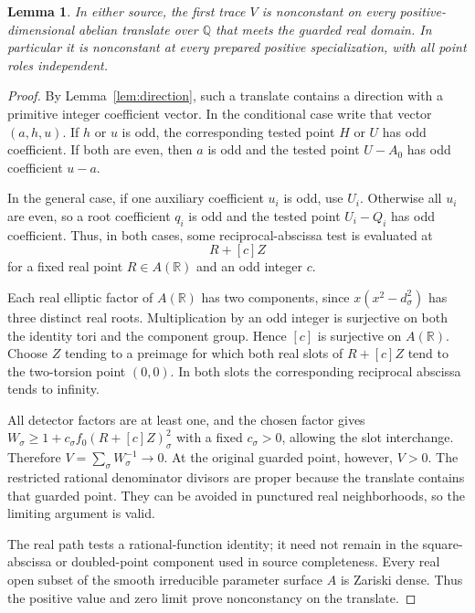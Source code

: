 \documentclass[11pt,a4paper]{article}
\newtheorem{lemma}[theorem]{Lemma}
\newcommand{\Q}{\mathbb Q}\newcommand{\Z}{\mathbb Z}
\begin{document}
\begin{lemma}\label{lem:nonconstant}
In either source, the first trace $V$ is nonconstant on every
positive-dimensional abelian translate over $\Q$ that meets the
guarded real domain. In particular it is nonconstant at every
prepared positive specialization, with all point roles independent.
\end{lemma}
\begin{proof}
By Lemma~\ref{lem:direction}, such a translate contains a direction
with a primitive integer coefficient vector. In the conditional
case write that vector $(a,h,u)$. If $h$ or $u$ is odd, the
corresponding tested point $H$ or $U$ has odd coefficient. If
both are even, then $a$ is odd and the tested point $U-A_0$ has
odd coefficient $u-a$.

In the general case, if one auxiliary coefficient $u_i$ is odd,
use $U_i$. Otherwise all $u_i$ are even, so a root coefficient
$q_i$ is odd and the tested point $U_i-Q_i$ has odd coefficient.
Thus, in both cases, some reciprocal-abscissa test is evaluated at
\[
                             R+[c]Z
\]
for a fixed real point $R\in A(\mathbb R)$ and an odd integer $c$.

Each real elliptic factor of $A(\mathbb R)$ has two components,
since $x(x^2-d_\sigma^2)$ has three distinct real roots.
Multiplication by an odd integer is surjective on both the identity
tori and the component group. Hence $[c]$ is surjective on
$A(\mathbb R)$. Choose $Z$ tending to a preimage for which both
real slots of $R+[c]Z$ tend to the two-torsion point $(0,0)$.
In both slots the corresponding reciprocal abscissa tends to infinity.

All detector factors are at least one, and the chosen factor gives
$W_\sigma\ge1+c_\sigma f_0(R+[c]Z)_\sigma^2$ with a fixed
$c_\sigma>0$, allowing the slot interchange. Therefore
$V=\sum_\sigma W_\sigma^{-1}\longrightarrow0$.
At the original guarded point, however, $V>0$.
The restricted rational denominator divisors are proper because the
translate contains that guarded point. They can be avoided in
punctured real neighborhoods, so the limiting argument is valid.

The real path tests a rational-function identity; it need not remain
in the square-abscissa or doubled-point component used in source
completeness. Every real open subset of the smooth irreducible
parameter surface $A$ is Zariski dense. Thus the positive value and
zero limit prove nonconstancy on the translate.
\end{proof}
\end{document}
